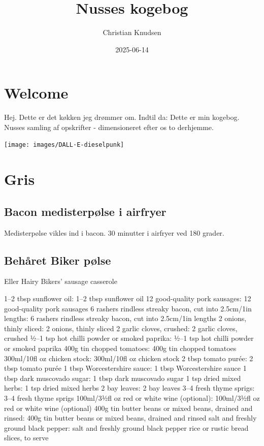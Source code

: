 \documentclass[
]{book}
\title{Nusses kogebog}
\author{Christian Knudsen}
\date{2025-06-14}
\begin{document}
\maketitle

{
\setcounter{tocdepth}{1}
\tableofcontents
}
\chapter{Welcome}\label{welcome}

Hej. Dette er det køkken jeg drømmer om. Indtil da:
Dette er min kogebog. Nusses samling af opskrifter - dimensioneret efter os to derhjemme.

\texttt{[image: images/DALL·E-dieselpunk]}

\chapter{Gris}\label{gris}

\section{Bacon medisterpølse i airfryer}\label{bacon-medisterpuxf8lse-i-airfryer}

Medisterpølse vikles ind i bacon.
30 minutter i airfryer ved 180 grader.

\section{Behåret Biker pølse}\label{behuxe5ret-biker-puxf8lse}

Eller Hairy Bikers' sausage casserole

1--2 tbsp sunflower oil: 1--2 tbsp sunflower oil
12 good-quality pork sausages: 12 good-quality pork sausages
6 rashers rindless streaky bacon, cut into 2.5cm/1in lengths: 6 rashers rindless streaky bacon, cut into 2.5cm/1in lengths
2 onions, thinly sliced: 2 onions, thinly sliced
2 garlic cloves, crushed: 2 garlic cloves, crushed
½--1 tsp hot chilli powder or smoked paprika: ½--1 tsp hot chilli powder or smoked paprika
400g tin chopped tomatoes: 400g tin chopped tomatoes
300ml/10fl oz chicken stock: 300ml/10fl oz chicken stock
2 tbsp tomato purée: 2 tbsp tomato purée
1 tbsp Worcestershire sauce: 1 tbsp Worcestershire sauce
1 tbsp dark muscovado sugar: 1 tbsp dark muscovado sugar
1 tsp dried mixed herbs: 1 tsp dried mixed herbs
2 bay leaves: 2 bay leaves
3--4 fresh thyme sprigs: 3--4 fresh thyme sprigs
100ml/3½fl oz red or white wine (optional): 100ml/3½fl oz red or white wine (optional)
400g tin butter beans or mixed beans, drained and rinsed: 400g tin butter beans or mixed beans, drained and rinsed
salt and freshly ground black pepper: salt and freshly ground black pepper
rice or rustic bread slices, to serve
\end{document}
